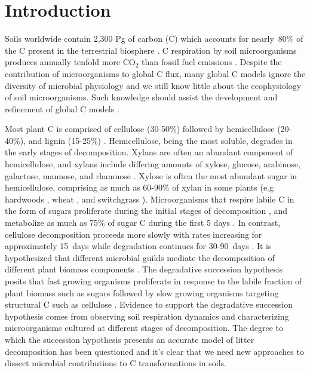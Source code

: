 \section{Introduction}
Soils worldwide contain 2,300 Pg of carbon (C) which accounts for nearly~80\%
of the C present in the terrestrial biosphere
\citep{Amundson_2001,BATJES_1996}. C respiration by soil microorganisms
produces annually tenfold more CO$_{2}$ than fossil fuel emissions
\citep{chapin2002principles}. Despite the contribution of microorganisms to
global C flux, many global C models ignore the diversity of microbial
physiology \citep{Allison2010,Six2006,Treseder2011} and we still know little
about the ecophysiology of soil microorganisms. Such knowledge should
assist the development and refinement of global C models
\citep{Bradford2008,Neff_2001,McGuire2010,Wieder2013}.

Most plant C is comprised of cellulose (30-50\%) followed by hemicellulose
(20-40\%), and lignin (15-25\%) \citep{Lynd2002}. Hemicellulose, being the most
soluble, degrades in the early stages of decomposition. Xylans are often an
abundant component of hemicellulose, and xylans include differing
amounts of xylose, glucose, arabinose, galactose, mannose, and rhamnose
\citep{Saha2003}. Xylose is often the most abundant sugar in hemicellulose,
comprising as much as 60-90\% of xylan in some plants (e.g hardwoods
\citep{Spiridon2008}, wheat \citep{Sun2005}, and switchgrass
\citep{Bunnell2013}). Microorganisms that respire labile C in the form of sugars
proliferate during the initial stages of decomposition
\citep{Garrett1951,Alexander1964}, and metabolize as much as 75\% of sugar
C during the first 5 days \citep{Engelking2007}. In contrast,
cellulose decomposition proceeds more slowly with rates increasing for
approximately 15~days while degradation continues for 30-90~days
\citep{Hu1997,Engelking2007}. It is hypothesized that different microbial
guilds mediate the decomposition of different plant biomass components
\citep{Hu1997,Rui2009,AnneliseHKjoller2002,Bastian_2009}. The degradative
succession hypothesis posits that fast growing organisms proliferate in
response to the labile fraction of plant biomass such as sugars
\citep{Garrett1963,Bremer1994} followed by slow growing organisms targeting
structural C such as cellulose \citep{Garrett1963}. Evidence to support the
degradative succession hypothesis comes from observing soil respiration
dynamics and characterizing microorganisms cultured at different stages of
decomposition. The degree to which the succession hypothesis presents an
accurate model of litter decomposition has been questioned
\citep{AnneliseHKjoller2002,Frankland_1998,Osono_2005} and it's clear that we
need new approaches to dissect microbial contributions to C transformations in
soils.

